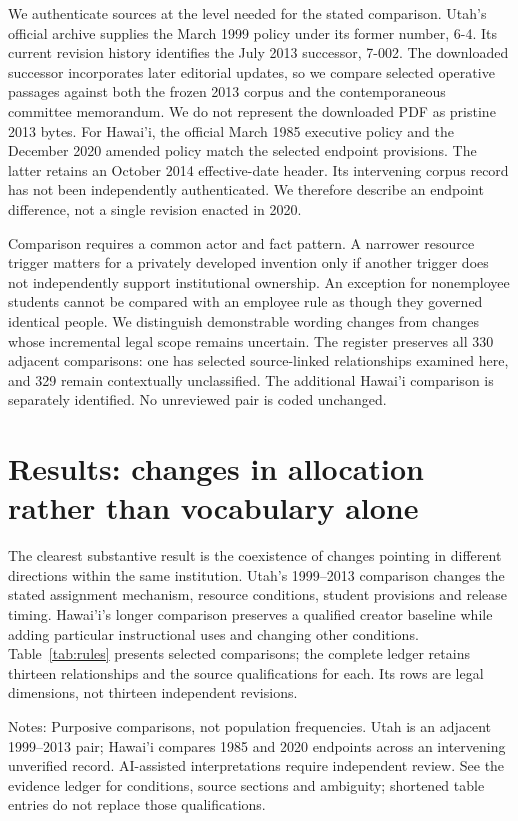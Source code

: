 \documentclass[12pt]{article}
\begin{document}
We authenticate sources at the level needed for the stated comparison. Utah's official archive supplies the March 1999 policy under its former number, 6-4. Its current revision history identifies the July 2013 successor, 7-002. The downloaded successor incorporates later editorial updates, so we compare selected operative passages against both the frozen 2013 corpus and the contemporaneous committee memorandum. We do not represent the downloaded PDF as pristine 2013 bytes. For Hawai'i, the official March 1985 executive policy and the December 2020 amended policy match the selected endpoint provisions. The latter retains an October 2014 effective-date header. Its intervening corpus record has not been independently authenticated. We therefore describe an endpoint difference, not a single revision enacted in 2020.

Comparison requires a common actor and fact pattern. A narrower resource trigger matters for a privately developed invention only if another trigger does not independently support institutional ownership. An exception for nonemployee students cannot be compared with an employee rule as though they governed identical people. We distinguish demonstrable wording changes from changes whose incremental legal scope remains uncertain. The register preserves all 330 adjacent comparisons: one has selected source-linked relationships examined here, and 329 remain contextually unclassified. The additional Hawai'i comparison is separately identified. No unreviewed pair is coded unchanged.

\section{Results: changes in allocation rather than vocabulary alone}
The clearest substantive result is the coexistence of changes pointing in different directions within the same institution. Utah's 1999--2013 comparison changes the stated assignment mechanism, resource conditions, student provisions and release timing. Hawai'i's longer comparison preserves a qualified creator baseline while adding particular instructional uses and changing other conditions. Table~\ref{tab:rules} presents selected comparisons; the complete ledger retains thirteen relationships and the source qualifications for each. Its rows are legal dimensions, not thirteen independent revisions.

\begin{table}[htbp]
\centering\caption{Selected changes in stated relationships}\label{tab:rules}
\small
\par\smallskip\footnotesize\raggedright Notes: Purposive comparisons, not population frequencies. Utah is an adjacent 1999--2013 pair; Hawai'i compares 1985 and 2020 endpoints across an intervening unverified record. AI-assisted interpretations require independent review. See the evidence ledger for conditions, source sections and ambiguity; shortened table entries do not replace those qualifications.
\end{table}
\end{document}
